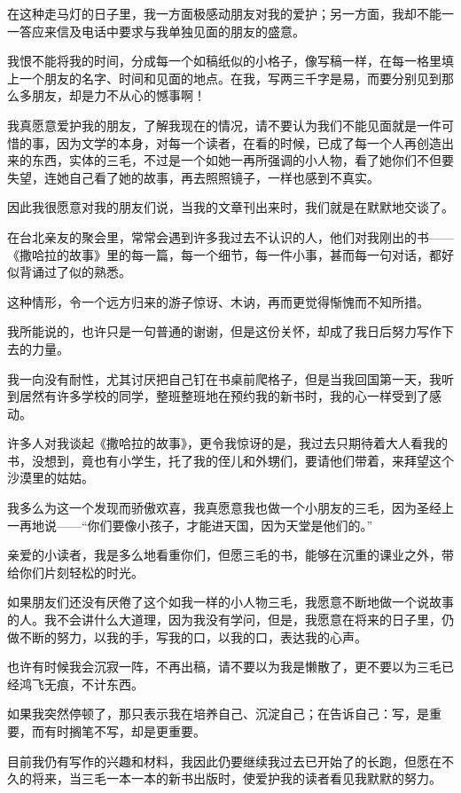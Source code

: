 \par 在这种走马灯的日子里，我一方面极感动朋友对我的爱护；另一方面，我却不能一一答应来信及电话中要求与我单独见面的朋友的盛意。
\par 我恨不能将我的时间，分成每一个如稿纸似的小格子，像写稿一样，在每一格里填上一个朋友的名字、时间和见面的地点。在我，写两三千字是易，而要分别见到那么多朋友，却是力不从心的憾事啊！
\par 我真愿意爱护我的朋友，了解我现在的情况，请不要认为我们不能见面就是一件可惜的事，因为文学的本身，对每一个读者，在看的时候，已成了每一个人再创造出来的东西，实体的三毛，不过是一个如她一再所强调的小人物，看了她你们不但要失望，连她自己看了她的故事，再去照照镜子，一样也感到不真实。
\par 因此我很愿意对我的朋友们说，当我的文章刊出来时，我们就是在默默地交谈了。
\par 在台北亲友的聚会里，常常会遇到许多我过去不认识的人，他们对我刚出的书——《撒哈拉的故事》里的每一篇，每一个细节，每一件小事，甚而每一句对话，都好似背诵过了似的熟悉。
\par 这种情形，令一个远方归来的游子惊讶、木讷，再而更觉得惭愧而不知所措。
\par 我所能说的，也许只是一句普通的谢谢，但是这份关怀，却成了我日后努力写作下去的力量。
\par 我一向没有耐性，尤其讨厌把自己钉在书桌前爬格子，但是当我回国第一天，我听到居然有许多学校的同学，整班整班地在预约我的新书时，我的心一样受到了感动。
\par 许多人对我谈起《撒哈拉的故事》，更令我惊讶的是，我过去只期待着大人看我的书，没想到，竟也有小学生，托了我的侄儿和外甥们，要请他们带着，来拜望这个沙漠里的姑姑。
\par 我多么为这一个发现而骄傲欢喜，我真愿意我也做一个小朋友的三毛，因为圣经上一再地说——“你们要像小孩子，才能进天国，因为天堂是他们的。”
\par 亲爱的小读者，我是多么地看重你们，但愿三毛的书，能够在沉重的课业之外，带给你们片刻轻松的时光。
\par 如果朋友们还没有厌倦了这个如我一样的小人物三毛，我愿意不断地做一个说故事的人。我不会讲什么大道理，因为我没有学问，但是，我愿意在将来的日子里，仍做不断的努力，以我的手，写我的口，以我的口，表达我的心声。
\par 也许有时候我会沉寂一阵，不再出稿，请不要以为我是懒散了，更不要以为三毛已经鸿飞无痕，不计东西。
\par 如果我突然停顿了，那只表示我在培养自己、沉淀自己；在告诉自己：写，是重要，而有时搁笔不写，却是更重要。
\par 目前我仍有写作的兴趣和材料，我因此仍要继续我过去已开始了的长跑，但愿在不久的将来，当三毛一本一本的新书出版时，使爱护我的读者看见我默默的努力。
